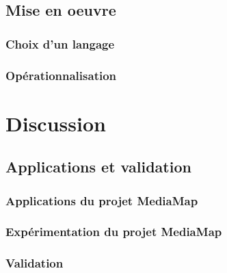 \chapter{Mise en oeuvre}\label{chap:op}
\minitoc
\section{Choix d'un langage}\label{sec:ln}
\section{Opérationnalisation}\label{sec:op}




\part*{Discussion}
\chapter{Applications et validation}\label{chap:app}
\minitoc
\section{Applications du projet MediaMap}\label{sec:app}
\section{Expérimentation du projet MediaMap}\label{sec:xp}
\section{Validation}\label{sec:val}

